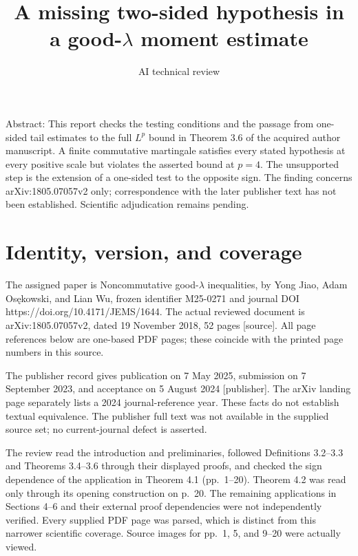 \documentclass[10pt]{article}
\title{A missing two-sided hypothesis in a good-\(\lambda\) moment estimate}
\author{AI technical review}
\date{}
\begin{document}
\maketitle
Abstract: This report checks the testing conditions and the passage from one-sided tail estimates to the full \(L^p\) bound in Theorem 3.6 of the acquired author manuscript. A finite commutative martingale satisfies every stated hypothesis at every positive scale but violates the asserted bound at \(p=4\). The unsupported step is the extension of a one-sided test to the opposite sign. The finding concerns arXiv:1805.07057v2 only; correspondence with the later publisher text has not been established. Scientific adjudication remains pending.\par
\section*{Identity, version, and coverage}
The assigned paper is Noncommutative good-\(\lambda\) inequalities, by Yong Jiao, Adam Osękowski, and Lian Wu, frozen identifier M25-0271 and journal DOI https://doi.org/10.4171/JEMS/1644. The actual reviewed document is arXiv:1805.07057v2, dated 19 November 2018, 52 pages [source]. All page references below are one-based PDF pages; these coincide with the printed page numbers in this source.\par
The publisher record gives publication on 7 May 2025, submission on 7 September 2023, and acceptance on 5 August 2024 [publisher]. The arXiv landing page separately lists a 2024 journal-reference year. These facts do not establish textual equivalence. The publisher full text was not available in the supplied source set; no current-journal defect is asserted.\par
The review read the introduction and preliminaries, followed Definitions 3.2–3.3 and Theorems 3.4–3.6 through their displayed proofs, and checked the sign dependence of the application in Theorem 4.1 (pp. 1–20). Theorem 4.2 was read only through its opening construction on p. 20. The remaining applications in Sections 4–6 and their external proof dependencies were not independently verified. Every supplied PDF page was parsed, which is distinct from this narrower scientific coverage. Source images for pp. 1, 5, and 9–20 were actually viewed.\par
\end{document}
